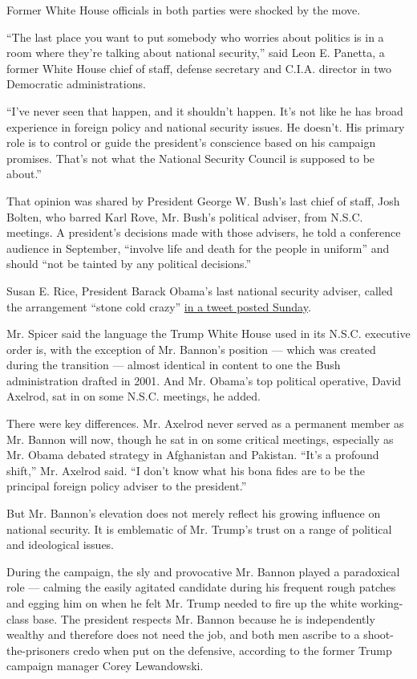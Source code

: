 Former White House officials in both parties were shocked by the move.

``The last place you want to put somebody who worries about politics is
in a room where they're talking about national security,'' said Leon E.
Panetta, a former White House chief of staff, defense secretary and
C.I.A. director in two Democratic administrations.

``I've never seen that happen, and it shouldn't happen. It's not like he
has broad experience in foreign policy and national security issues. He
doesn't. His primary role is to control or guide the president's
conscience based on his campaign promises. That's not what the National
Security Council is supposed to be about.''

That opinion was shared by President George W. Bush's last chief of
staff, Josh Bolten, who barred Karl Rove, Mr. Bush's political adviser,
from N.S.C. meetings. A president's decisions made with those advisers,
he told a conference audience in September, ``involve life and death for
the people in uniform'' and should ``not be tainted by any political
decisions.''

Susan E. Rice, President Barack Obama's last national security adviser,
called the arrangement ``stone cold crazy''
\href{https://twitter.com/AmbassadorRice/status/825612583159803904}{in a
tweet posted Sunday}.

Mr. Spicer said the language the Trump White House used in its N.S.C.
executive order is, with the exception of Mr. Bannon's position ---
which was created during the transition --- almost identical in content
to one the Bush administration drafted in 2001. And Mr. Obama's top
political operative, David Axelrod, sat in on some N.S.C. meetings, he
added.

There were key differences. Mr. Axelrod never served as a permanent
member as Mr. Bannon will now, though he sat in on some critical
meetings, especially as Mr. Obama debated strategy in Afghanistan and
Pakistan. ``It's a profound shift,'' Mr. Axelrod said. ``I don't know
what his bona fides are to be the principal foreign policy adviser to
the president.''

But Mr. Bannon's elevation does not merely reflect his growing influence
on national security. It is emblematic of Mr. Trump's trust on a range
of political and ideological issues.

During the campaign, the sly and provocative Mr. Bannon played a
paradoxical role --- calming the easily agitated candidate during his
frequent rough patches and egging him on when he felt Mr. Trump needed
to fire up the white working-class base. The president respects Mr.
Bannon because he is independently wealthy and therefore does not need
the job, and both men ascribe to a shoot-the-prisoners credo when put on
the defensive, according to the former Trump campaign manager Corey
Lewandowski.

